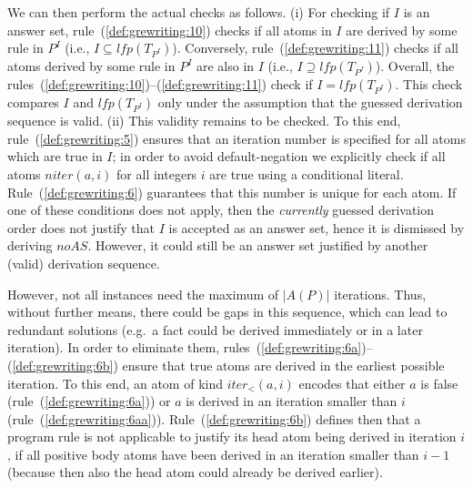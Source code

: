 \documentclass[11pt,fleqn,twoside]{article}
\begin{document}
{			We can then perform the actual checks as follows.
			(i) For checking if $I$ is an answer set, rule~(\ref{def:grewriting:10}) checks if all atoms in $I$ are derived
			by some rule in $P^I$ (i.e., $I \subseteq \mathit{lfp}(T_{P^I})$). Conversely, rule~(\ref{def:grewriting:11})
			checks if all atoms derived by some rule in $P^I$ are also in $I$ (i.e., $I \supseteq \mathit{lfp}(T_{P^I})$).
			Overall, the rules~(\ref{def:grewriting:10})--(\ref{def:grewriting:11}) check if $I = \mathit{lfp}(T_{P^I})$.
			This check compares $I$ and $\mathit{lfp}(T_{P^I})$ only under the assumption that the guessed derivation sequence is valid.
			(ii)
			This validity remains to be checked. To this end,
			rule~(\ref{def:grewriting:5}) ensures that an iteration number is specified for all atoms which are true in $I$;
			in order to avoid default-negation we explicitly check if all atoms $\mathit{niter}(a, i)$ for all integers $i$ are true using a conditional literal.
			Rule~(\ref{def:grewriting:6}) guarantees that this number is unique for each atom.
			If one of these conditions does not apply, then the \emph{currently}
			guessed derivation order does not justify that $I$ is accepted as an answer set,
			hence it is dismissed by deriving $\mathit{noAS}$.
			However, it could still be an answer set justified by another (valid) derivation sequence.

			However, not all instances need the maximum of $|A(P)|$ iterations. Thus, without further means, there could be gaps in this sequence,
			which can lead to redundant solutions (e.g.~a fact could be derived immediately or in a later iteration).
			In order to eliminate them, rules~(\ref{def:grewriting:6a})--(\ref{def:grewriting:6b}) ensure that true atoms are derived in the earliest possible iteration.
			To this end, an atom of kind $\mathit{iter}_{<}(a, i)$ encodes that either $a$ is false (rule~(\ref{def:grewriting:6a})) or $a$ is derived in an iteration smaller than $i$ (rule~(\ref{def:grewriting:6aa})).
			Rule~(\ref{def:grewriting:6b}) defines then that a program rule is not applicable to justify its head atom being derived in iteration $i$,
			if all positive body atoms have been derived in an iteration smaller than $i-1$ (because then also the head atom could already be derived earlier).
}
\end{document}
